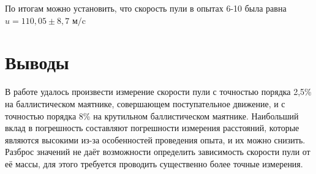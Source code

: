 \documentclass[a4paper,12pt]{article}
\begin{document}
По итогам можно установить, что скорость пули в опытах 6-10 была равна $u = 110,05 \pm 8,7 \text{ м/c}$

\section{Выводы}
В работе удалось произвести измерение скорости пули с точностью порядка 2,5\% на
баллисти\-ческом маятнике, совершающем поступательное движение, и с точностью
порядка 8\% на крутильном баллистическом маятнике. Наибольший вклад
в погрешность составляют погреш\-ности измерения расстояний, которые являются
высокими из-за особенностей проведения опыта, и их можно снизить. Разброс
значений не даёт возможности определить зависимость скорости пули от её массы,
для этого требуется проводить существенно более точные измерения.
\end{document}
